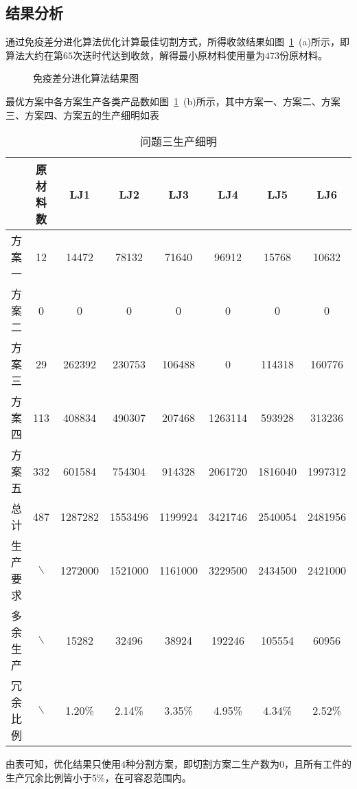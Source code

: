 \documentclass{whutmod}
\begin{document}
    \subsection{结果分析}
    通过免疫差分进化算法优化计算最佳切割方式，所得收敛结果如图~\ref{asdmsd}~(a)所示，即算法大约在第$65$次迭时代达到收敛，解得最小原材料使用量为$473$份原材料。
    	\begin{figure}[H]
    	\centering
    	\caption{免疫差分进化算法结果图}\label{asdmsd}
    \end{figure}
    最优方案中各方案生产各类产品数如图~\ref{asdmsd}~(b)所示，其中方案一、方案二、方案三、方案四、方案五的生产细明如表
    \begin{table}[H]
    	\centering		
    	\caption{问题三生产细明}
    	\begin{tabular}{cccccccc}
    		\toprule[2pt]
    		\multicolumn{1}{m{2cm}}{\centering }
    		& \multicolumn{1}{m{2cm}}{\centering 原材料数}
    		& \multicolumn{1}{m{1cm}}{\centering LJ1}
    		& \multicolumn{1}{m{1cm}}{\centering LJ2}
    		& \multicolumn{1}{m{1cm}}{\centering LJ3}
    		& \multicolumn{1}{m{1cm}}{\centering LJ4}
    		& \multicolumn{1}{m{1cm}}{\centering LJ5}
    		& \multicolumn{1}{m{1cm}}{\centering LJ6}
    		\\
    		\midrule[1pt]
    	    方案一 & 12 &  14472     &  78132  &     71640   &    96912 &      15768    &   10632\\ 
    		方案二 & 0&  0   &  0 &      0 &     0 &     0    &       0\\ 
    		方案三 & 29& 262392   &   230753   &   106488    &       0   &   114318    &  160776\\ 
    		方案四&  113&   408834 &     490307 &     207468 &    1263114&      593928    &  313236\\ 
    		方案五 & 332 & 601584   &   754304  &    914328 &    2061720&     1816040 &    1997312\\ 
    		  总计 &487 &  1287282  &   1553496  &   1199924   &  3421746   &  2540054   &  2481956\\ 
    		生产要求 &$\backslash$ & 1272000&1521000 &1161000 & 3229500&2434500 & 2421000\\ 
    		多余生产 &$\backslash$ &  15282    &   32496   &   38924     & 192246    &  105554    &   60956\\
    		冗余比例 &$\backslash$&  1.20\%   & 2.14\% &   3.35\%   & 4.95\% &  4.34\%   & 2.52\% \\ 
    		\bottomrule[2pt]	
    	\end{tabular}
    \end{table}
   由表可知，优化结果只使用$4$种分割方案，即切割方案二生产数为$0$，且所有工件的生产冗余比例皆小于5\%，在可容忍范围内。
\end{document}
